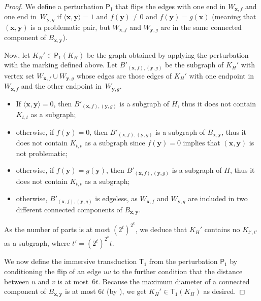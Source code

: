 \documentclass[10pt,a4paper]{amsart}
\begin{document}
\begin{proof}
	We define a perturbation $\mathsf P_1$ that flips the edges with one end in 
	$W_{\mathbf x,f}$ and one end in~$W_{\mathbf y,g}$ if
	$\langle\mathbf{x},\mathbf{y}\rangle=1$ and
	$f(\mathbf y)\neq 0$ and $f(\mathbf y)=g(\mathbf x)$ (meaning that 	 $(\mathbf x,\mathbf y)$ is a problematic pair, but 	$W_{\mathbf x,f}$ and $W_{\mathbf y,g}$  are in the same connected component of $B_{\mathbf x,\mathbf y}$).
	
	Now, let $K_H'\in\mathsf P_1(K_H)$ be the graph obtained by applying the perturbation with the marking defined above.
	Let $B'_{(\mathbf x,f),(\mathbf y,g)}$ be the subgraph of $K_H'$
	with vertex set  $W_{\mathbf x,f}\cup W_{\mathbf y,g}$ whose edges are those edges of $K_H'$ with one endpoint in  $W_{\mathbf x,f}$ and the other endpoint in~$W_{\mathbf y,g}$.
	\begin{itemize}
		\item If $\langle\mathbf x,\mathbf y\rangle=0$, then $B'_{(\mathbf x,f),(\mathbf y,g)}$ is a subgraph of $H$, thus it does not contain $K_{t,t}$ as a subgraph;
		\item otherwise, if $f(\mathbf y)=0$, then $B'_{(\mathbf x,f),(\mathbf y,g)}$ is a subgraph of $B_{\mathbf x,\mathbf y}$, thus it does not contain $K_{t,t}$ as a subgraph since $f(\mathbf y)=0$ implies that $(\mathbf x,\mathbf y)$ is not problematic;
		\item otherwise, if $f(\mathbf y)=g(\mathbf y)$, then $B'_{(\mathbf x,f),(\mathbf y,g)}$ is a subgraph of $H$, thus it does not contain $K_{t,t}$ as a subgraph;
		\item otherwise,  $B'_{(\mathbf x,f),(\mathbf y,g)}$ is edgeless, as $W_{\mathbf x,f}$ and $W_{\mathbf y,g}$ are included in two different connected components of $B_{\mathbf x,\mathbf y}$.
	\end{itemize}
	As the number of parts is at most $(2^t)^{2^k}$, we deduce that
	$K_H'$ contains no $K_{t',t'}$ as a subgraph, where
	$t'=(2^t)^{2^k}t$.
	
	We now define the immersive transduction $\mathsf T_1$ from the perturbation $\mathsf P_1$ by conditioning the flip of an edge $uv$ to the further condition that the distance between $u$ and $v$ is at most~$6t$. Because the maximum diameter of a connected component of $B_{\mathbf x,\mathbf y}$ is at most $6t$ (by ), we get $K_H'\in\mathsf T_1(K_H)$ as desired.
\end{proof}
\end{document}
